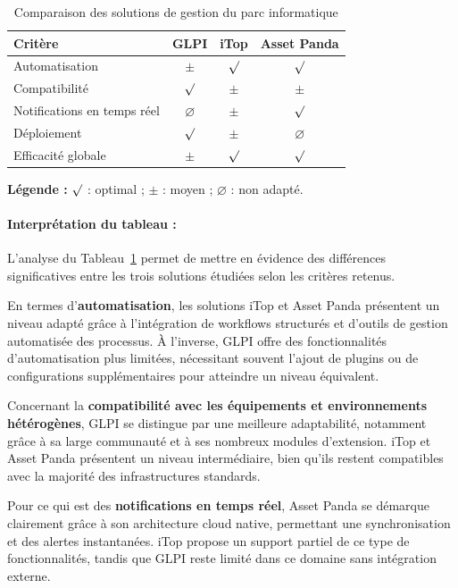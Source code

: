 \begin{table}[H]
\centering
\caption{Comparaison des solutions de gestion du parc informatique}
\label{tab:comparaison_parc_informatique}
\begin{tabular}{|l|c|c|c|}
\hline
\textbf{Critère} & \textbf{GLPI} & \textbf{iTop} & \textbf{Asset Panda} \\ \hline
Automatisation & $\pm$ & $\surd$ & $\surd$ \\ \hline
Compatibilité & $\surd$ & $\pm$ & $\pm$ \\ \hline
Notifications en temps réel & $\varnothing$ & $\pm$ & $\surd$ \\ \hline
Déploiement & $\surd$ & $\pm$ & $\varnothing$ \\ \hline
Efficacité globale & $\pm$ & $\surd$ & $\surd$ \\ \hline
\end{tabular}
\end{table}

\noindent
{\footnotesize
\textbf{Légende :} $\surd$ : optimal ; $\pm$ : moyen ; $\varnothing$ : non adapté.
}

\paragraph{Interprétation du tableau :}

L’analyse du Tableau~\ref{tab:comparaison_parc_informatique} permet de mettre en évidence des différences significatives entre les trois solutions étudiées selon les critères retenus.

En termes d’\textbf{automatisation}, les solutions iTop et Asset Panda présentent un niveau adapté grâce à l’intégration de workflows structurés et d’outils de gestion automatisée des processus. À l’inverse, GLPI offre des fonctionnalités d’automatisation plus limitées, nécessitant souvent l’ajout de plugins ou de configurations supplémentaires pour atteindre un niveau équivalent.

Concernant la \textbf{compatibilité avec les équipements et environnements hétérogènes}, GLPI se distingue par une meilleure adaptabilité, notamment grâce à sa large communauté et à ses nombreux modules d’extension. iTop et Asset Panda présentent un niveau intermédiaire, bien qu’ils restent compatibles avec la majorité des infrastructures standards.

Pour ce qui est des \textbf{notifications en temps réel}, Asset Panda se démarque clairement grâce à son architecture cloud native, permettant une synchronisation et des alertes instantanées. iTop propose un support partiel de ce type de fonctionnalités, tandis que GLPI reste limité dans ce domaine sans intégration externe.

